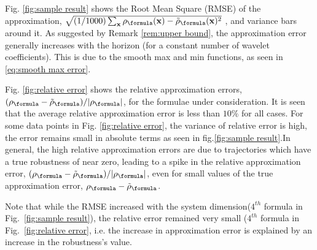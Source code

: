 Fig. \ref{fig:sample result} shows the Root Mean Square (RMSE) of the approximation, $\sqrt{(1/1000)\sum_{\sstraj}\robf(\sstraj)-\srobf(\sstraj)^2}$
, and variance bars around it.
As suggested by Remark \ref{rem:upper bound}, the approximation error generally increases with the horizon (for a constant number of wavelet coefficients).
This is due to the smooth max and min functions, as seen in \eqref{eq:smooth max error}.

Fig. \ref{fig:relative error} shows the relative approximation errors, $(\robf-\srobf)/|\robf|$, for the formulae under consideration. 
It is seen that the average relative approximation error is less than $10\%$ for all cases. 
For some data points in Fig. \ref{fig:relative error}, the variance of relative error is high, the error remains small in absolute terms as seen in fig.\ref{fig:sample result}.In general, the high relative approximation errors are due to trajectories which have a true robustness of near zero, leading to a spike in the relative approximation error, $(\robf-\srobf)/|\robf|$, even for small values of the true approximation error, $\robf-\srobf$.



Note that while the RMSE  increased with the system dimension($4^{th}$ formula in Fig.~\ref{fig:sample result}), the relative error remained very small ($4^{th}$ formula in Fig.~\ref{fig:relative error}, i.e. the increase in approximation error is explained by an increase in the robustness's value. 

